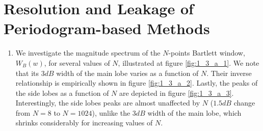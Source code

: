 \section{Resolution and Leakage of Periodogram-based Methods}

\begin{enumerate}[label=\alph*), leftmargin=*]
\item
%

We investigate the magnitude spectrum of the $N$-points Bartlett window, $W_{B}(w)$, for several values of $N$, illustrated at figure \ref{fig:1_3_a_1}.
We note that its $3dB$ width of the main lobe varies as a function of $N$. Their inverse relationship is empirically shown in figure \ref{fig:1_3_a_2}.
Lastly, the peaks of the side lobes as a function of $N$ are depicted in figure \ref{fig:1_3_a_3}. Interestingly, the side lobes peaks are almost unaffected
by $N$ ($1.5 dB$ change from $N=8$ to $N=1024$), unlike the $3dB$ width of the main lobe, which shrinks considerably for increasing values of $N$.


\end{enumerate}
